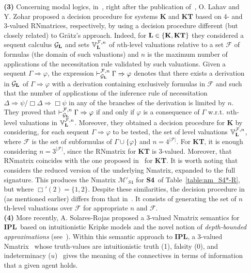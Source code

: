 \documentclass[12pt]{article}
\newcommand{\ipl}{\ensuremath{\mathbf{IPL}}}
\newcommand{\sfo}{\textbf{S4}}
\begin{document}
{\bf(3)} Concerning modal logics, in~\cite{lah:zoh:22}, right after the publication of~\cite{gratz_truth_2022}, O. Lahav and Y. Zohar proposed a decision procedure for systems {\bf K} and {\bf KT} based on 4- and 3-valued RNmatrices, respectively, by using a decision procedure different (but closely related) to Gr\"atz's approach. Indeed, for ${\bf L} \in \{ {\bf K}, {\bf KT}\}$ they considered a sequent calculus $\mathcal{G}_{\bf L}$ and sets $\mathbb{V}_{\bf L}^{\mathcal{F},n}$ of $n$th-level valuations relative to a set $\mathcal{F}$ of formulas (the domain of such valuations) and $n$ is the maximum number of applications of the necessitation rule validated by such valuations. Given a sequent $\Gamma \Rightarrow \varphi$, the expression $\vdash_{\mathcal{G}_{\bf L}}^{\mathcal{F},n}\Gamma  \Rightarrow \varphi$ denotes that there exists a derivation in $\mathcal{G}_{\bf L}$ of  $\Gamma \Rightarrow \varphi$ with a derivation containing exclusively formulas in $\mathcal{F}$ and such that the number of applications of the inference rule of necessitation $\Delta \Rightarrow \psi / \Box\Delta \Rightarrow \Box\psi$ in any of the branches of the derivation is limited by $n$. They proved that  $\vdash_{\mathcal{G}_{\bf L}}^{\mathcal{F},n}\Gamma  \Rightarrow \varphi$ if and only if $\varphi$ is a consequence of $\Gamma$ w.r.t. $n$th-level valuations in $\mathbb{V}_{\bf L}^{\mathcal{F},n}$. Moreover, they obtained a decision procedure for {\bf K} by considering, for each sequent $\Gamma \Rightarrow \varphi$ to be tested, the set of level valuations  $\mathbb{V}_{\bf L}^{\mathcal{F},n}$, where  $\mathcal{F}$ is the set of subformulas of $\Gamma \cup \{\varphi\}$ and $n=4^{|\mathcal{F}|}$. For {\bf KT}, it is enough considering $n=3^{|\mathcal{F}|}$, since the RNmatrix for {\bf KT} is 3-valued. Moreover, that RNmatrix coincides with the one proposed in~\cite{gratz_truth_2022} for {\bf KT}. It is worth noting that~\cite{lah:zoh:22} considers the reduced version of the underlying Nmatrix, expanded to the full signature. This produces the Nmatrix  $\mathcal{M}'_{S4}$ for \sfo\ of Table~\ref{table:nm_S4*-R}, but where $\Box'(2)=\{1,2\}$. 
Despite these similarities, the decision procedure in~\cite{lah:zoh:22} (as mentioned earlier) differs from that in~\cite{gratz_truth_2022}. It consists of generating the set of $n$th-level valuations over $\mathcal{F}$ for appropriate $n$ and $\mathcal{F}$.\\[1mm]
{\bf(4)} More recently, A. Solares-Rojas proposed a 3-valued Nmatrix semantics for \ipl\ based on intuitionistic Kripke models and the novel notion of {\em depth-bounded approximations} (see~\cite[Chapter~5]{Solares-Rojas}). Within this semantic approach to \ipl, a 3-valued Nmatrix \textemdash\ whose truth-values are intuitionistic truth (1), falsity (0), and indeterminacy ($u$) \textemdash\  gives the meaning of the connectives in terms of information that a given agent holds. 
\end{document}
